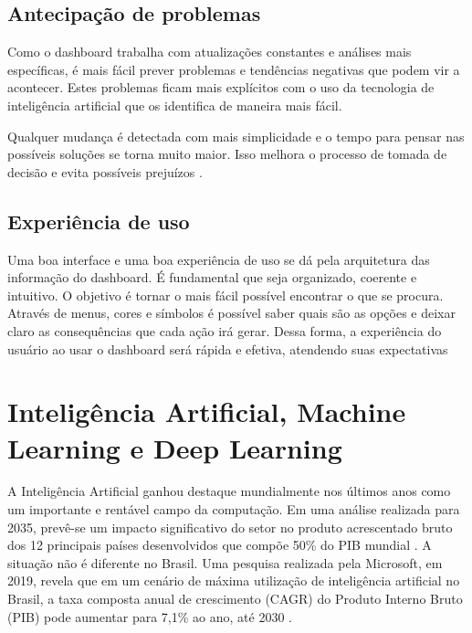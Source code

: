 \subsection{Antecipação de problemas}

\indent
\par Como o dashboard trabalha com atualizações constantes e análises mais específicas, é mais fácil prever problemas e tendências negativas que podem vir a acontecer. Estes problemas ficam mais explícitos com o uso da tecnologia de inteligência artificial que os identifica de maneira mais fácil.

\par Qualquer mudança é detectada com mais simplicidade e o tempo para pensar nas possíveis soluções se torna muito maior. Isso melhora o processo de tomada de decisão e evita possíveis prejuízos \cite{Systemsat}.

\subsection{Experiência de uso}

\indent
\par Uma boa interface e uma boa experiência de uso se dá pela arquitetura das informação do dashboard. É fundamental que seja organizado, coerente e intuitivo. O objetivo é tornar o mais fácil possível encontrar o que se procura. Através de menus, cores e  símbolos é possível saber quais são as opções e deixar claro as consequências que cada ação irá gerar. Dessa forma, a experiência do usuário ao usar o dashboard será rápida e efetiva, atendendo suas expectativas \cite{Hostinger}

\section{Inteligência Artificial, Machine Learning e Deep Learning}

\indent
\par A Inteligência Artificial ganhou destaque mundialmente nos últimos anos como um importante e rentável campo da computação. Em uma análise realizada para 2035, prevê-se um impacto significativo do setor no produto acrescentado bruto dos 12 principais países desenvolvidos que compõe 50\% do PIB mundial \cite{Accenture2016}. A situação não é diferente no Brasil. Uma pesquisa realizada pela Microsoft, em 2019, revela que em um cenário de máxima utilização de inteligência artificial no Brasil, a taxa composta anual de crescimento (CAGR) do Produto Interno Bruto (PIB) pode aumentar para 7,1\% ao ano, até 2030 \cite{MicrosoftNewsCenterBrasil2019}.

